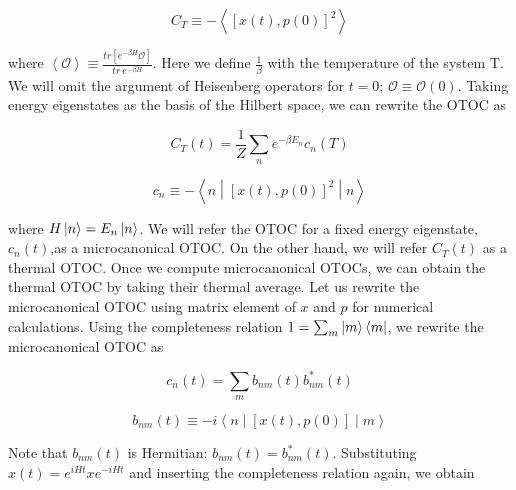 \documentclass[12pt]{report}
\newcommand*{\1}{\hspace{1pt}}
\begin{document}
        \begin{equation}
            C_{T} \equiv  - \left\langle\left[x(t),p(0)\right]^{2}\right\rangle
        \end{equation}

        where $\left\langle \mathcal{O} \right\rangle \equiv \frac{tr\left[e^{-\beta H }\mathcal{O}\right]}{tr \ e^{-\beta H}}$. Here we define $\frac{1}{\beta}$ with 
        the temperature of the system T. We will omit the argument of Heisenberg operators for $t=0$; $\mathcal{O} \equiv \mathcal{O}(0)$. Taking energy eigenstates as 
        the basis of the Hilbert space, we can rewrite the OTOC as 

        \begin{equation}
            C_{T}(t) = \frac{1}{Z} \sum _{n} e^{-\beta E_{n}} c_{n}(T)
        \end{equation}

        \begin{equation}
            c_{n} \equiv -\left\langle n \middle|\left[x(t),p(0)\right]^{2}\middle| n\right\rangle
        \end{equation}

        where $H\ket{n}=E_{n}\ket{n}$. We will refer the OTOC for a fixed energy eigenstate, $c_{n}(t)$,as a microcanonical OTOC. On the other hand, we will refer $C_{T}(t)$ as a
        thermal OTOC. Once we compute microcanonical OTOCs, we can obtain the thermal OTOC by taking their thermal average. Let us rewrite the microcanonical OTOC using 
        matrix element of $x$ and $p$ for numerical calculations. Using the completeness relation $1 = \sum_{m} \ket{m}\bra{m}$, we rewrite the microcanonical OTOC as 

        \begin{equation}
            c_{n}(t) = \sum_{m} b_{nm}(t) b_{nm} ^{*} (t)  
        \end{equation}
        
        \begin{equation}
            b_{nm}(t) \equiv   -i\left\langle n \middle|\left[x(t),p(0)\right]\middle| m\right\rangle
        \end{equation}

        Note that $b_{nm}(t)$ is Hermitian: $b_{nm}(t) = b_{nm} ^{*} (t)$. Substituting $x(t) = e^{iHt}xe^{-iHt}$ and inserting the completeness relation again, we obtain
\end{document}
